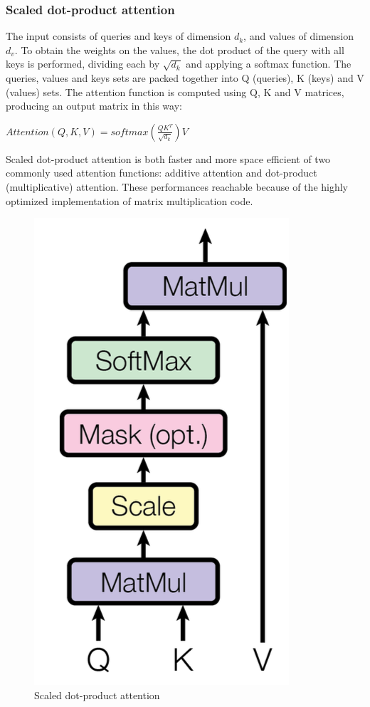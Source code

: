\documentclass[\main/main.tex]{subfiles}
\begin{document}
\subsubsection{Scaled dot-product attention} 
The input consists of queries and keys of dimension $d_k$, and values of dimension $d_v$.
To obtain the weights on the values, the dot product of the query with all keys is performed, dividing each by $\sqrt{d_k}$ and applying a softmax function. The queries, values and keys sets are packed together into Q (queries), K (keys) and V (values) sets. 
The attention function is computed using Q, K and V matrices, producing an output matrix in this way:
\begin{center}
    $Attention(Q, K, V) = softmax(\frac{QK^T}{\sqrt{d_k}})V$
\end{center}
Scaled dot-product attention is both faster and more space efficient of two commonly used attention functions: additive attention and dot-product (multiplicative) attention. These performances reachable because of the highly optimized implementation of matrix multiplication code.
\begin{figure}[h!]
    \centering
    \includegraphics[scale=0.35]{images/transformer/scaled_dot_product_attention.png}
    \caption{Scaled dot-product attention}
    \label{fig:scaled_dot-product_attention}
\end{figure}
\end{document}
